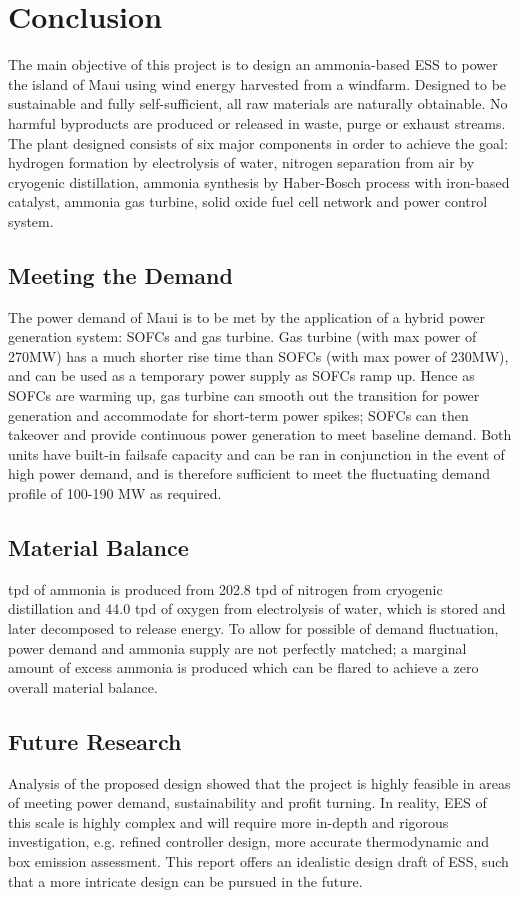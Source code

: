 %

\section{Conclusion}
\noindent The main objective of this project is to design an ammonia-based ESS to power the island of Maui using wind energy harvested from a windfarm. Designed to be sustainable and fully self-sufficient, all raw materials are naturally obtainable. No harmful byproducts are produced or released in waste, purge or exhaust streams. The plant designed consists of six major components in order to achieve the goal: hydrogen formation by electrolysis of water, nitrogen separation from air by cryogenic distillation, ammonia synthesis by Haber-Bosch process with iron-based catalyst, ammonia gas turbine, solid oxide fuel cell network and power control system.
\subsection{Meeting the Demand}
\noindent The power demand of Maui is to be met by the application of a hybrid power generation system: SOFCs and gas turbine. Gas turbine (with max power of 270MW) has a much shorter rise time than SOFCs (with max power of 230MW), and can be used as a temporary power supply as SOFCs ramp up. Hence as SOFCs are warming up, gas turbine can smooth out the transition for power generation and accommodate for short-term power spikes; SOFCs can then takeover and provide continuous power generation to meet baseline demand. Both units have built-in failsafe capacity and can be ran in conjunction in the event of high power demand, and is therefore sufficient to meet the fluctuating demand profile of 100-190 MW as required.
\subsection{Material Balance}
 tpd of ammonia is produced from 202.8 tpd of nitrogen from cryogenic distillation and 44.0 tpd of oxygen from electrolysis of water, which is stored and later decomposed to release energy. To allow for possible of demand fluctuation, power demand and ammonia supply are not perfectly matched; a marginal amount of excess ammonia is produced which can be flared to achieve a zero overall material balance.
\subsection{Future Research}
\noindent Analysis of the proposed design showed that the project is highly feasible in areas of meeting power demand, sustainability and profit turning. In reality, EES of this scale is highly complex and will require more in-depth and rigorous investigation, e.g. refined controller design, more accurate thermodynamic and box emission assessment. This report offers an idealistic design draft of ESS, such that a more intricate design can be pursued in the future.
%